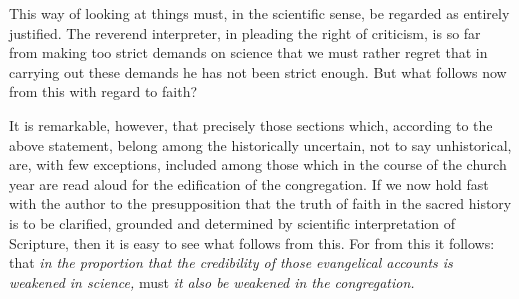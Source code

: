 \documentclass[12pt,a4paper,openany]{book}
\begin{document}
This way of looking at things must, in the scientific sense,
be regarded as entirely justified. The reverend
interpreter, in pleading the right of criticism, is so far
from making too strict demands on science that
we must rather regret that in carrying out these
demands he has not been strict enough. But what follows
now from this with regard to faith?

It is remarkable, however, that precisely those sections which, according to
the above statement, belong among the historically uncertain, not
to say unhistorical, are, with few exceptions,
included among those which in the course of the church year are read aloud
for the edification of the congregation. If we now hold fast with
the author to the presupposition that the truth of faith
in the sacred history is to be clarified, grounded and
determined by scientific interpretation of Scripture, then it is
easy to see what follows from this. For from this it follows: that
\emph{in the proportion that the credibility of those evangelical accounts is
weakened in science,} must
\emph{it also be weakened in the congregation.}
\end{document}
